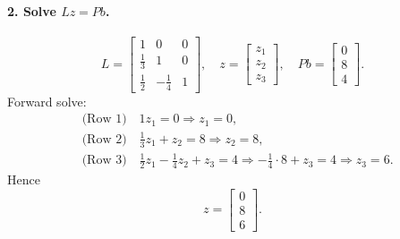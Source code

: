 \documentclass{article}
\begin{document}
\paragraph{2. Solve $Lz = Pb$.}
$$
    L
    =
    \begin{bmatrix}
        1        & 0         & 0 \\
        \tfrac13 & 1         & 0 \\
        \tfrac12 & -\tfrac14 & 1
    \end{bmatrix},
    \quad
    z = \begin{bmatrix}z_1\\z_2\\z_3\end{bmatrix},
    \quad
    Pb = \begin{bmatrix}0\\8\\4\end{bmatrix}.
$$
Forward solve:
$$
    \begin{aligned}
         & \text{(Row 1)}\quad 1z_1 = 0 \Longrightarrow z_1=0,              \\
         & \text{(Row 2)}\quad \tfrac13z_1 + z_2 = 8 \Longrightarrow z_2=8, \\
         & \text{(Row 3)}\quad \tfrac12z_1 - \tfrac14z_2 + z_3 = 4
        \Longrightarrow
        -\tfrac14\cdot 8 + z_3 = 4
        \Longrightarrow
        z_3=6.
    \end{aligned}
$$
Hence
$$
    z
    =
    \begin{bmatrix}
        0 \\
        8 \\
        6
    \end{bmatrix}.
$$
\end{document}
